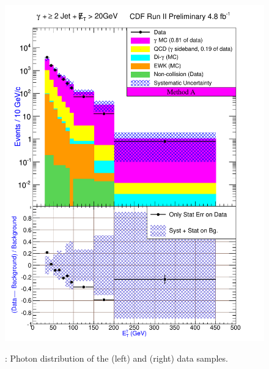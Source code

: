 \documentclass[11pt]{article}
\begin{document}
\begin{figure}[h!]
{ \includegraphics[scale=\resultsHistScale,keepaspectratio=true]{./g30jetmet20_MtdA_plot2_Et_pho.pdf}
}

 \caption{: Photon \et distribution of the \phoonejetmettwenty (left) and \photwojetmettwenty (right) data samples.}
 \label{fig:Result_MtdA_gj1Met20_PhoEt}
\end{figure}
\end{document}
